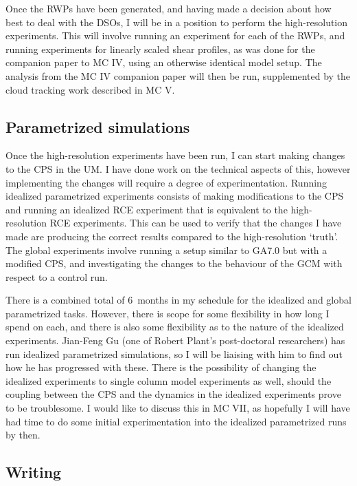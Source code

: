 \documentclass[11pt,a4paper]{article}
\begin{document}
Once the RWPs have been generated, and having made a decision about how best to deal with the DSOs, I will be in a position to perform the high-resolution experiments. This will involve running an experiment for each of the RWPs, and running experiments for linearly scaled shear profiles, as was done for the companion paper to MC IV, using an otherwise identical model setup. The analysis from the MC IV companion paper will then be run, supplemented by the cloud tracking work described in MC V.

\subsection{Parametrized simulations}
\label{sec:Parametrized simulations}

Once the high-resolution experiments have been run, I can start making changes to the CPS in the UM. I have done work on the technical aspects of this, however implementing the changes will require a degree of experimentation. Running idealized parametrized experiments consists of making modifications to the CPS and running an idealized RCE experiment that is equivalent to the high-resolution RCE experiments. This can be used to verify that the changes I have made are producing the correct results compared to the high-resolution `truth'. The global experiments involve running a setup similar to GA7.0 but with a modified CPS, and investigating the changes to the behaviour of the GCM with respect to a control run.

There is a combined total of \SI{6}{months} in my schedule for the idealized and global parametrized tasks.  However, there is scope for some flexibility in how long I spend on each, and there is also some flexibility as to the nature of the idealized experiments. Jian-Feng Gu (one of Robert Plant's post-doctoral researchers) has run idealized parametrized simulations, so I will be liaising with him to find out how he has progressed with these. There is the possibility of changing the idealized experiments to single column model experiments as well, should the coupling between the CPS and the dynamics in the idealized experiments prove to be troublesome. I would like to discuss this in MC VII, as hopefully I will have had time to do some initial experimentation into the idealized parametrized runs by then.

\subsection{Writing}
\label{sec:Writing}
\end{document}
